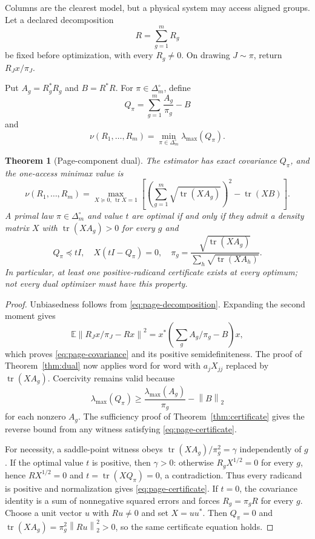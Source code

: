 \documentclass[11pt]{article}
\newtheorem{theorem}{Theorem}[section]
\theoremstyle{definition}
\newcommand{\tr}{\operatorname{tr}}
\newcommand{\E}{\mathbb E}
\newcommand{\norm}[1]{\left\lVert #1\right\rVert}
\begin{document}
Columns are the clearest model, but a physical system may access aligned groups.  Let a declared
decomposition
\begin{equation}
  R=\sum_{g=1}^mR_g
  \label{eq:page-decomposition}
\end{equation}
be fixed before optimization, with every $R_g\ne0$.  On drawing $J\sim\pi$, return
$R_Jx/\pi_J$.

Put $A_g=R_g^*R_g$ and $B=R^*R$.  For $\pi\in\Delta_m^\circ$, define
\begin{equation}
  Q_\pi=\sum_{g=1}^m\frac{A_g}{\pi_g}-B
  \label{eq:page-covariance}
\end{equation}
and
\begin{equation}
  \nu(R_1,\ldots,R_m)=
  \min_{\pi\in\Delta_m^\circ}\lambda_{\max}(Q_\pi).
  \label{eq:page-primal}
\end{equation}

\begin{theorem}[Page-component dual]
\label{thm:page-dual}
The estimator has exact covariance $Q_\pi$, and the one-access minimax value is
\begin{equation}
  \nu(R_1,\ldots,R_m)
  =\max_{X\succeq0,\,\tr X=1}
  \left[
    \left(\sum_{g=1}^m\sqrt{\tr(XA_g)}\right)^2-\tr(XB)
  \right].
  \label{eq:page-dual}
\end{equation}
A primal law $\pi\in\Delta_m^\circ$ and value $t$ are optimal if and only if they admit a density
matrix $X$ with $\tr(XA_g)>0$ for every $g$ and
\begin{equation}
  Q_\pi\preceq tI,\quad X(tI-Q_\pi)=0,\quad
  \pi_g=\frac{\sqrt{\tr(XA_g)}}{\sum_h\sqrt{\tr(XA_h)}}.
  \label{eq:page-certificate}
\end{equation}
In particular, at least one positive-radicand certificate exists at every optimum; not every dual
optimizer must have this property.
\end{theorem}

\begin{proof}
Unbiasedness follows from \eqref{eq:page-decomposition}.  Expanding the second moment gives
\[
  \E\norm{R_Jx/\pi_J-Rx}^2
  =x^*\left(\sum_gA_g/\pi_g-B\right)x,
\]
which proves \eqref{eq:page-covariance} and its positive semidefiniteness.  The proof of
Theorem~\ref{thm:dual} now applies word for word with
$a_jX_{jj}$ replaced by $\tr(XA_g)$.  Coercivity remains valid because
\[
  \lambda_{\max}(Q_\pi)
  \ge \frac{\lambda_{\max}(A_g)}{\pi_g}-\norm{B}_2
\]
for each nonzero $A_g$.  The sufficiency proof of Theorem~\ref{thm:certificate} gives the reverse
bound from any witness satisfying \eqref{eq:page-certificate}.

For necessity, a saddle-point witness obeys
$\tr(XA_g)/\pi_g^2=\gamma$ independently of $g$.  If the optimal value $t$ is positive, then
$\gamma>0$: otherwise $R_gX^{1/2}=0$ for every $g$, hence $RX^{1/2}=0$ and
$t=\tr(XQ_\pi)=0$, a contradiction.  Thus every radicand is positive and normalization gives
\eqref{eq:page-certificate}.  If $t=0$, the covariance identity is a sum of nonnegative squared
errors and forces $R_g=\pi_gR$ for every $g$.  Choose a unit vector $u$ with $Ru\ne0$ and set
$X=uu^*$.  Then $Q_\pi=0$ and
$\tr(XA_g)=\pi_g^2\norm{Ru}_2^2>0$, so the same certificate equation holds.
\end{proof}
\end{document}
